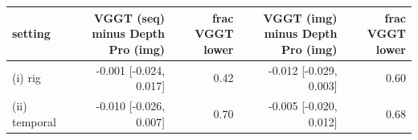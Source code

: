 \footnotesize\renewcommand{\arraystretch}{0.92}
\begin{tabular}{lrrrr}
\toprule
setting & VGGT (seq) minus Depth Pro (img) & frac VGGT lower & VGGT (img) minus Depth Pro (img) & frac VGGT lower \\
\midrule
(i) rig & -0.001 [-0.024, 0.017] & 0.42 & -0.012 [-0.029, 0.003] & 0.60 \\
(ii) temporal & -0.010 [-0.026, 0.007] & 0.70 & -0.005 [-0.020, 0.012] & 0.68 \\
\bottomrule
\end{tabular}
